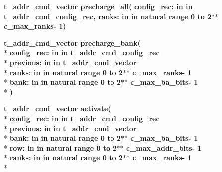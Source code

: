 \begin{DoxyCompactItemize}
{\bfseries {\bfseries {\bfseries {\bf t\+\_\+addr\+\_\+cmd\+\_\+vector}} \textcolor{vhdlchar}{ }}} {\bf precharge\+\_\+all}{\bfseries  ( }{\bfseries \textcolor{vhdlchar}{config\+\_\+rec\+: }\textcolor{stringliteral}{in }\textcolor{vhdlchar}{in t\+\_\+addr\+\_\+cmd\+\_\+config\+\_\+rec}}{\bfseries  , \textcolor{vhdlchar}{ranks\+: }\textcolor{stringliteral}{in }\textcolor{vhdlchar}{in natural   range  0 to  2$\ast$$\ast$   c\+\_\+max\+\_\+ranks-\/ 1}}{\bfseries  )} 
\item 
{\bfseries {\bfseries {\bfseries {\bf t\+\_\+addr\+\_\+cmd\+\_\+vector}} \textcolor{vhdlchar}{ }}} {\bf precharge\+\_\+bank}{\bfseries  ( }\\*
{\bfseries \textcolor{vhdlchar}{config\+\_\+rec\+: }\textcolor{stringliteral}{in }\textcolor{vhdlchar}{in t\+\_\+addr\+\_\+cmd\+\_\+config\+\_\+rec}}\\*
{\bfseries \textcolor{vhdlchar}{previous\+: }\textcolor{stringliteral}{in }\textcolor{vhdlchar}{in t\+\_\+addr\+\_\+cmd\+\_\+vector}}\\*
{\bfseries \textcolor{vhdlchar}{ranks\+: }\textcolor{stringliteral}{in }\textcolor{vhdlchar}{in natural   range  0 to  2$\ast$$\ast$   c\+\_\+max\+\_\+ranks-\/ 1}}\\*
{\bfseries \textcolor{vhdlchar}{bank\+: }\textcolor{stringliteral}{in }\textcolor{vhdlchar}{in natural   range  0 to  2$\ast$$\ast$   c\+\_\+max\+\_\+ba\+\_\+bits-\/ 1}}\\*
{\bfseries  )} 
\item 
{\bfseries {\bfseries {\bfseries {\bf t\+\_\+addr\+\_\+cmd\+\_\+vector}} \textcolor{vhdlchar}{ }}} {\bf activate}{\bfseries  ( }\\*
{\bfseries \textcolor{vhdlchar}{config\+\_\+rec\+: }\textcolor{stringliteral}{in }\textcolor{vhdlchar}{in t\+\_\+addr\+\_\+cmd\+\_\+config\+\_\+rec}}\\*
{\bfseries \textcolor{vhdlchar}{previous\+: }\textcolor{stringliteral}{in }\textcolor{vhdlchar}{in t\+\_\+addr\+\_\+cmd\+\_\+vector}}\\*
{\bfseries \textcolor{vhdlchar}{bank\+: }\textcolor{stringliteral}{in }\textcolor{vhdlchar}{in natural   range  0 to  2$\ast$$\ast$   c\+\_\+max\+\_\+ba\+\_\+bits-\/ 1}}\\*
{\bfseries \textcolor{vhdlchar}{row\+: }\textcolor{stringliteral}{in }\textcolor{vhdlchar}{in natural   range  0 to  2$\ast$$\ast$   c\+\_\+max\+\_\+addr\+\_\+bits-\/ 1}}\\*
{\bfseries \textcolor{vhdlchar}{ranks\+: }\textcolor{stringliteral}{in }\textcolor{vhdlchar}{in natural   range  0 to  2$\ast$$\ast$   c\+\_\+max\+\_\+ranks-\/ 1}}\\*

\end{DoxyCompactItemize}
